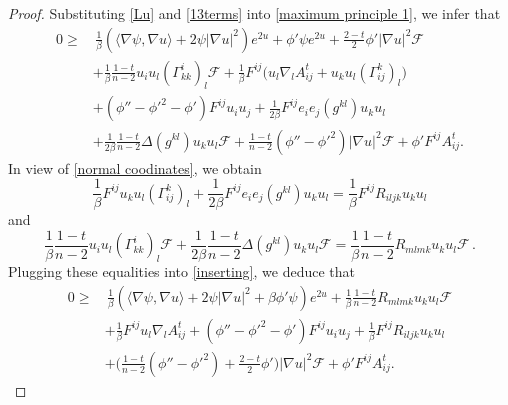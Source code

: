 \documentclass{article}
\theoremstyle{plain}
\theoremstyle{definition}
\theoremstyle{definition}
\numberwithin{equation}{section}
\begin{document}
\begin{sloppypar}
\begin{proof}
Substituting \eqref{Lu} and \eqref{13terms} into \eqref{maximum principle 1}, we infer  that
\begin{equation}\label{inserting}
\begin{split}
0\geq &\,  \frac{1}{\beta}(\langle \nabla \psi, \nabla u\rangle +2\psi|\nabla u|^2)e^{2u}+\phi'\psi e^{2u}+  \frac{2-t}{2}\phi' |\nabla u|^2\mathcal{F}\\
&+\frac{1}{\beta}\frac{1-t}{n-2}u_{i}u_{l}(\Gamma_{kk}^{i})_{l} \mathcal{F}  + \frac{1}{\beta}F^{ij}\big(u_{l}\nabla_{l}A^{t}_{ij}+u_{k}u_{l}(\Gamma_{ij}^{k})_{l}\big)\\
&+(\phi''-\phi'^2-\phi')F^{ij}u_{i}u_{j}+\frac{1}{2\beta}F^{ij}e_{i}e_{j}(g^{kl})u_{k}u_{l}\\
&+\frac{1}{2\beta}\frac{1-t}{n-2}\Delta(g^{kl})u_{k}u_{l}\mathcal{F}+\frac{1-t}{n-2}(\phi''-\phi'^2)|\nabla u|^2\mathcal{F}+\phi'F^{ij}A^{t}_{ij}.
\end{split}
\end{equation}
In view of \eqref{normal coodinates}, we obtain
\[
\frac{1}{\beta}F^{ij}u_{k}u_{l}(\Gamma_{ij}^{k})_{l}+\frac{1}{2\beta}F^{ij}e_{i}e_{j}(g^{kl})u_{k}u_{l}=\frac{1}{\beta}F^{ij}R_{iljk}u_{k}u_{l}
\]
and
\[
\frac{1}{\beta}\frac{1-t}{n-2}u_{i}u_{l}(\Gamma_{kk}^{i})_{l} \mathcal{F}+\frac{1}{2\beta}\frac{1-t}{n-2}\Delta(g^{kl})u_{k}u_{l}\mathcal{F}=\frac{1}{\beta}\frac{1-t}{n-2}R_{mlmk}u_{k}u_{l}\mathcal{F}\,.
\]
Plugging these equalities into \eqref{inserting}, we deduce that
\begin{equation}\label{inserting 2}
\begin{split}
0\geq & \,  \frac{1}{\beta}(\langle \nabla \psi, \nabla u\rangle +2\psi|\nabla u|^2+\beta \phi'\psi)e^{2u}+\frac{1}{\beta}\frac{1-t}{n-2}R_{mlmk}u_{k}u_{l}\mathcal{F} \\
&+ \frac{1}{\beta}F^{ij} u_{l}\nabla_{l}A^{t}_{ij} +(\phi''-\phi'^2-\phi')F^{ij}u_{i}u_{j}+\frac{1}{\beta}F^{ij}R_{iljk}u_{k}u_{l}\\
&+\Big(\frac{1-t}{n-2}(\phi''-\phi'^2)+\frac{2-t}{2}\phi'\Big)|\nabla u|^2\mathcal{F}+\phi'F^{ij}A^{t}_{ij}.
\end{split}
\end{equation}


\end{proof}
\end{sloppypar}
\end{document}
